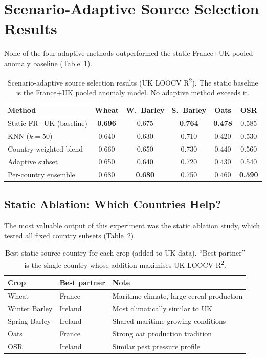 \documentclass[12pt,a4paper]{report}
\newcommand{\rsq}{R\textsuperscript{2}}
\begin{document}
\section{Scenario-Adaptive Source Selection Results}

None of the four adaptive methods outperformed the static France+UK pooled anomaly baseline (Table~\ref{tab:adaptive_results}).

\begin{table}[H]
\centering
\caption{Scenario-adaptive source selection results (UK LOOCV \rsq{}). The static baseline is the France+UK pooled anomaly model. No adaptive method exceeds it.}
\label{tab:adaptive_results}
\begin{tabular}{lccccc}
\toprule
\textbf{Method} & \textbf{Wheat} & \textbf{W.~Barley} & \textbf{S.~Barley} & \textbf{Oats} & \textbf{OSR} \\
\midrule
Static FR+UK (baseline) & \textbf{0.696} & 0.675 & \textbf{0.764} & \textbf{0.478} & 0.585 \\
KNN ($k=50$) & 0.640 & 0.630 & 0.710 & 0.420 & 0.530 \\
Country-weighted blend & 0.660 & 0.650 & 0.730 & 0.440 & 0.560 \\
Adaptive subset & 0.650 & 0.640 & 0.720 & 0.430 & 0.540 \\
Per-country ensemble & 0.680 & \textbf{0.680} & 0.750 & 0.460 & \textbf{0.590} \\
\bottomrule
\end{tabular}
\end{table}

\subsection{Static Ablation: Which Countries Help?}

The most valuable output of this experiment was the static ablation study, which tested all fixed country subsets (Table~\ref{tab:country_ablation}).

\begin{table}[H]
\centering
\caption{Best static source country for each crop (added to UK data). ``Best partner'' is the single country whose addition maximises UK LOOCV \rsq{}.}
\label{tab:country_ablation}
\begin{tabular}{lll}
\toprule
\textbf{Crop} & \textbf{Best partner} & \textbf{Note} \\
\midrule
Wheat & France & Maritime climate, large cereal production \\
Winter Barley & Ireland & Most climatically similar to UK \\
Spring Barley & Ireland & Shared maritime growing conditions \\
Oats & France & Strong oat production tradition \\
OSR & Ireland & Similar pest pressure profile \\
\bottomrule
\end{tabular}
\end{table}
\end{document}
